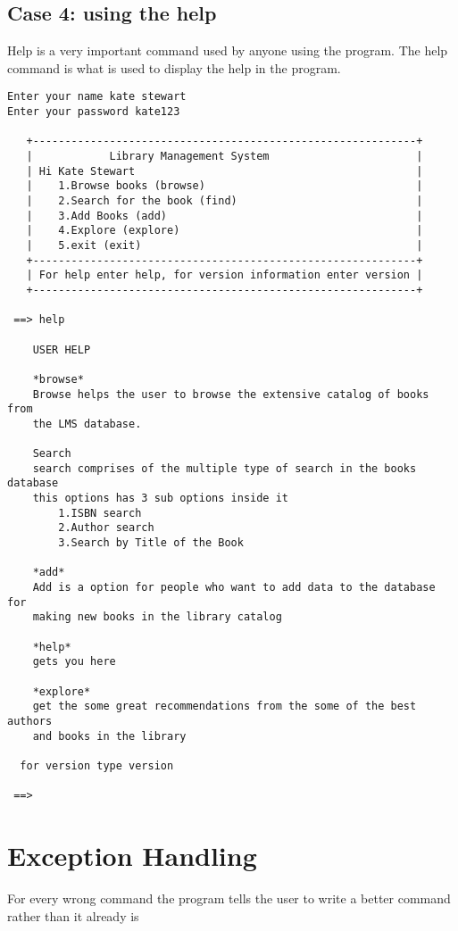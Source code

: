\documentclass[12pt, a4paper, titlepage, openany]{report}
\begin{document}
\subsection{Case 4: using the help}
Help is a very important command used by anyone using the program. The help command is what is used to display the help in the program.
\begin{verbatim}
Enter your name kate stewart
Enter your password kate123

   +------------------------------------------------------------+
   |            Library Management System                       |
   | Hi Kate Stewart                                            |
   |    1.Browse books (browse)                                 |
   |    2.Search for the book (find)                            |
   |    3.Add Books (add)                                       |
   |    4.Explore (explore)                                     |
   |    5.exit (exit)                                           |
   +------------------------------------------------------------+
   | For help enter help, for version information enter version |
   +------------------------------------------------------------+
    
 ==> help  

    USER HELP
    
    *browse*
    Browse helps the user to browse the extensive catalog of books from
    the LMS database.
    
    Search
    search comprises of the multiple type of search in the books database
    this options has 3 sub options inside it 
        1.ISBN search
        2.Author search
        3.Search by Title of the Book
        
    *add*
    Add is a option for people who want to add data to the database for 
    making new books in the library catalog
    
    *help*
    gets you here
    
    *explore*
    get the some great recommendations from the some of the best authors 
    and books in the library
    
  for version type version 
    
 ==> 

\end{verbatim}

\newpage
\section{Exception Handling}
For every wrong command the program tells the user to write a better command rather than it already is
\end{document}
